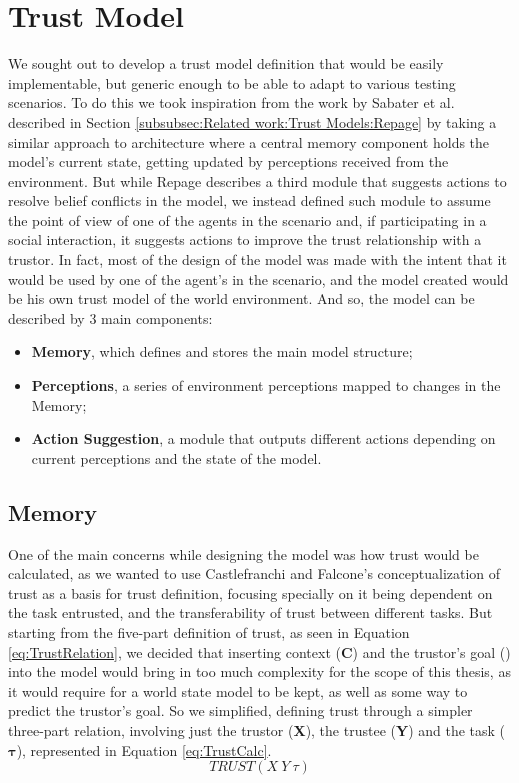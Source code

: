 
\section{Trust Model}
\label{sec:TrustModel}
We sought out to develop a trust model definition that would be easily implementable, but generic enough to be able to adapt to various testing scenarios. To do this we took inspiration from the work by Sabater et al.\cite{Sabater2006} described in Section \ref{subsubsec:Related work:Trust Models:Repage} by taking a similar approach to architecture where a central memory component holds the model's current state, getting updated by perceptions received from the environment. But while Repage describes a third module that suggests actions to resolve belief conflicts in the model, we instead defined such module to assume the point of view of one of the agents in the scenario and, if participating in a social interaction, it suggests actions to improve the trust relationship with a trustor. In fact, most of the design of the model was made with the intent that it would be used by one of the agent's in the scenario, and the model created would be his own trust model of the world environment. And so, the model can be described by 3 main components:
\begin{itemize}
    \item \textbf{Memory}, which defines and stores the main model structure;
    \item \textbf{Perceptions}, a series of environment perceptions mapped to changes in the Memory;
    \item \textbf{Action Suggestion}, a module that outputs different actions depending on current perceptions and the state of the model.
\end{itemize}

\subsection{Memory}
One of the main concerns while designing the model was how trust would be calculated, as we wanted to use Castlefranchi and Falcone's conceptualization of trust \cite{Castelfranchi2010} as a basis for trust definition, focusing specially on it being dependent on the task entrusted, and the transferability of trust between different tasks. But starting from the five-part definition of trust, as seen in Equation \ref{eq:TrustRelation}, we decided that inserting context (\textbf{C}) and the trustor's goal () into the model would bring in too much complexity for the scope of this thesis, as it would require for a world state model to be kept, as well as some way to predict the trustor's goal. So we simplified, defining trust through a simpler three-part relation, involving just the trustor (\textbf{X}), the trustee (\textbf{Y}) and the task ($\bm{\tau}$), represented in Equation \ref{eq:TrustCalc}.
\begin{equation}
TRUST(X\ Y\ \tau)
\label{eq:TrustCalc}
\end{equation}

